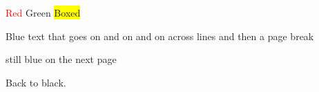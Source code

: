 \documentclass{article}
\begin{document}
\textcolor{red}{Red} \textcolor[rgb]{0,0.5,0.2}{Green} \colorbox{yellow}{Boxed} 
{\color{blue} Blue text that goes on and on and on across lines and then a page break \par
\newpage still blue on the next page}
Back to black.
\end{document}
